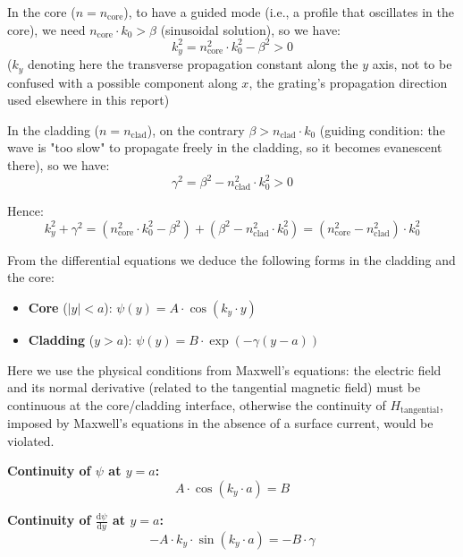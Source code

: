 \documentclass[a4paper,11pt]{report}
\begin{document}
In the core ($n = n_{\text{core}}$), to have a guided mode (i.e., a profile that oscillates in the core), we need $n_{\text{core}} \cdot k_0 > \beta$ (sinusoidal solution), so we have:
\begin{equation}
k_y^2 = n_{\text{core}}^2 \cdot k_0^2 - \beta^2 > 0
\end{equation}
($k_y$ denoting here the transverse propagation constant along the $y$ axis, not to be confused with a possible component along $x$, the grating's propagation direction used elsewhere in this report)

In the cladding ($n = n_{\text{clad}}$), on the contrary $\beta > n_{\text{clad}} \cdot k_0$ (guiding condition: the wave is "too slow" to propagate freely in the cladding, so it becomes evanescent there), so we have:
\begin{equation}
\gamma^2 = \beta^2 - n_{\text{clad}}^2 \cdot k_0^2 > 0
\end{equation}

Hence:
\begin{equation}
k_y^2 + \gamma^2 = (n_{\text{core}}^2 \cdot k_0^2 - \beta^2) + (\beta^2 - n_{\text{clad}}^2 \cdot k_0^2) = (n_{\text{core}}^2 - n_{\text{clad}}^2) \cdot k_0^2
\end{equation}

From the differential equations we deduce the following forms in the cladding and the core:
\begin{itemize}
    \item \textbf{Core} ($|y| < a$): $\psi(y) = A \cdot \cos(k_y \cdot y)$
    \item \textbf{Cladding} ($y > a$): $\psi(y) = B \cdot \exp(-\gamma (y-a))$
\end{itemize}

Here we use the physical conditions from Maxwell's equations: the electric field and its normal derivative (related to the tangential magnetic field) must be continuous at the core/cladding interface, otherwise the continuity of $H_{\text{tangential}}$, imposed by Maxwell's equations in the absence of a surface current, would be violated.

\vspace{0.5em}
\noindent \textbf{Continuity of $\psi$ at $y=a$:}
\begin{equation}
A \cdot \cos(k_y \cdot a) = B
\end{equation}

\noindent \textbf{Continuity of $\frac{\text{d}\psi}{\text{d}y}$ at $y=a$:}
\begin{equation}
-A \cdot k_y \cdot \sin(k_y \cdot a) = -B \cdot \gamma
\end{equation}
\end{document}
